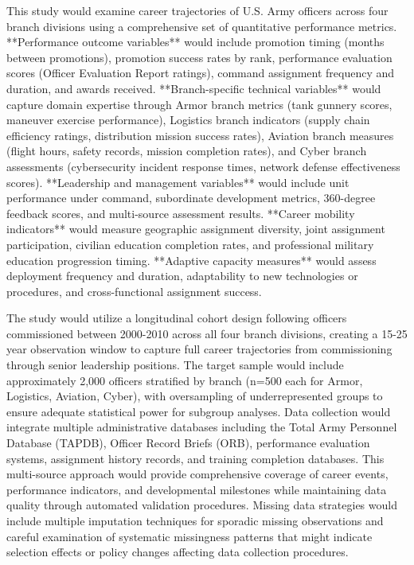 \documentclass[main.tex]{subfiles}
\begin{document}
This study would examine career trajectories of U.S. Army officers across four branch divisions using a comprehensive set of quantitative performance metrics. **Performance outcome variables** would include promotion timing (months between promotions), promotion success rates by rank, performance evaluation scores (Officer Evaluation Report ratings), command assignment frequency and duration, and awards received. **Branch-specific technical variables** would capture domain expertise through Armor branch metrics (tank gunnery scores, maneuver exercise performance), Logistics branch indicators (supply chain efficiency ratings, distribution mission success rates), Aviation branch measures (flight hours, safety records, mission completion rates), and Cyber branch assessments (cybersecurity incident response times, network defense effectiveness scores). **Leadership and management variables** would include unit performance under command, subordinate development metrics, 360-degree feedback scores, and multi-source assessment results. **Career mobility indicators** would measure geographic assignment diversity, joint assignment participation, civilian education completion rates, and professional military education progression timing. **Adaptive capacity measures** would assess deployment frequency and duration, adaptability to new technologies or procedures, and cross-functional assignment success.


The study would utilize a longitudinal cohort design following officers commissioned between 2000-2010 across all four branch divisions, creating a 15-25 year observation window to capture full career trajectories from commissioning through senior leadership positions. The target sample would include approximately 2,000 officers stratified by branch (n=500 each for Armor, Logistics, Aviation, Cyber), with oversampling of underrepresented groups to ensure adequate statistical power for subgroup analyses. Data collection would integrate multiple administrative databases including the Total Army Personnel Database (TAPDB), Officer Record Briefs (ORB), performance evaluation systems, assignment history records, and training completion databases. This multi-source approach would provide comprehensive coverage of career events, performance indicators, and developmental milestones while maintaining data quality through automated validation procedures. Missing data strategies would include multiple imputation techniques for sporadic missing observations and careful examination of systematic missingness patterns that might indicate selection effects or policy changes affecting data collection procedures.
\end{document}
